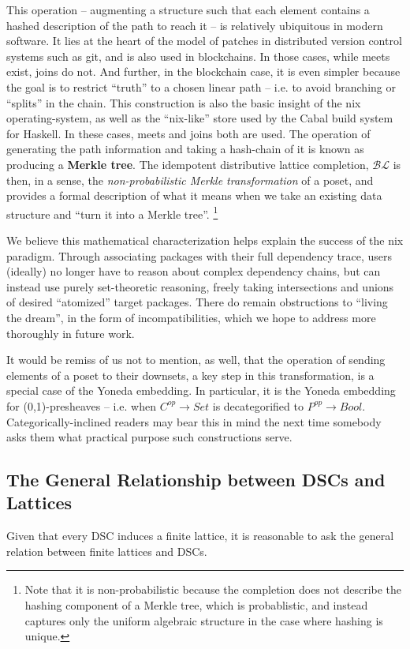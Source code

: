 \documentclass[hoptionsi,review,screen,format=acmsmall]{acmart}
\theoremstyle{definition}
\newcommand{\BLc}{\mathcal{BL}}
\begin{document}
This operation -- augmenting a structure such that each element contains a hashed description of the path to reach it -- is relatively ubiquitous in modern software. It lies at the heart of the model of patches in distributed version control systems such as git, and is also used in blockchains. In those cases, while meets exist, joins do not. And further, in the blockchain case, it is even simpler because the goal is to restrict ``truth'' to a chosen linear path -- i.e. to avoid branching or ``splits'' in the chain. This construction is also the basic insight of the nix operating-system, as well as the ``nix-like'' store used by the Cabal build system for Haskell. In these cases, meets and joins both are used. The operation of generating the path information and taking a hash-chain of it is known as producing a \textbf{Merkle tree}\cite{merkle1987digital}. The idempotent distributive lattice completion, \(\BLc\) is then, in a sense,  the \textit{non-probabilistic Merkle transformation} of a poset, and provides a formal description of what it means when we take an existing data structure and ``turn it into a Merkle tree''. \footnote{Note that it is non-probabilistic because the completion does not describe the hashing component of a Merkle tree, which is probablistic, and instead captures only the uniform algebraic structure in the case where hashing is unique.} 

We believe this mathematical characterization helps explain the success of the nix paradigm. Through associating packages with their full dependency trace, users (ideally) no longer have to reason about complex dependency chains, but can instead use purely set-theoretic reasoning, freely taking intersections and unions of desired ``atomized'' target packages. There do remain obstructions to ``living the dream'', in the form of incompatibilities, which we hope to address more thoroughly in future work.

It would be remiss of us not to mention, as well, that the operation of sending elements of a poset to their downsets, a key step in this transformation, is a special case of the Yoneda embedding. In particular, it is the Yoneda embedding for (0,1)-presheaves -- i.e. when \(C^{op} \to Set\) is decategorified to \(P^{op} \to Bool\). Categorically-inclined readers may bear this in mind the next time somebody asks them what practical purpose such constructions serve.

\subsection{The General Relationship between DSCs and Lattices}
Given that every DSC induces a finite lattice, it is reasonable to ask the general relation between finite lattices and DSCs. 
\end{document}

